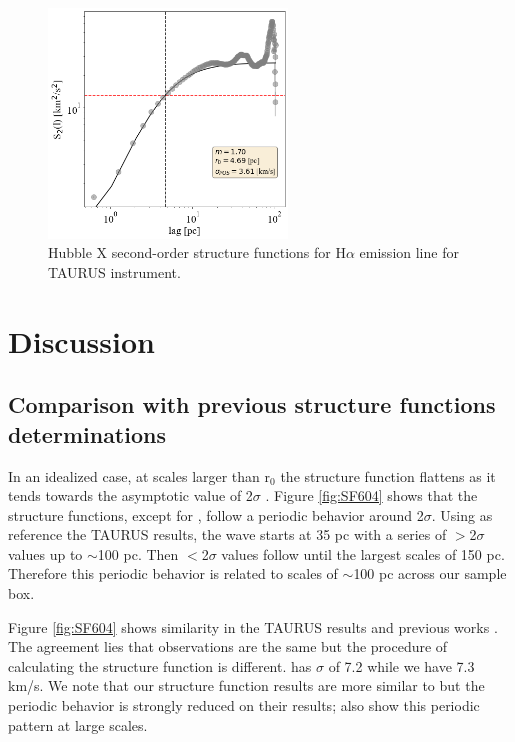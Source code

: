 \documentclass[fleqn,usenatbib]{mnras}
\begin{document}
\begin{figure}
\centering 
\includegraphics[width=2.5in]{Figures/HX}
\caption{Hubble X second-order structure functions for H$\alpha$ emission line for TAURUS instrument.}
\label{fig:SFX}
\end{figure}

\clearpage


\section{Discussion}\label{sec:disc}

\subsection{Comparison with previous structure functions determinations}

In an idealized case, at scales larger than r$_{0}$ the structure function flattens as it tends towards the asymptotic value of 2$\sigma$ \citep{arthur2016turbulence}. Figure \ref{fig:SF604} shows that the structure functions, except for \cite{2019arXiv191203543M}, follow a periodic behavior around 2$\sigma$. Using as reference the TAURUS results, the wave starts at 35 pc with a series of $ >$2$\sigma$ values up to $\sim$100 pc. Then $<$2$\sigma$ values follow until the largest scales of 150 pc. Therefore this periodic behavior is related to scales of $\sim$100 pc across our sample box.

Figure \ref{fig:SF604} shows similarity in the TAURUS results and previous works \citep{tanco1997,2019arXiv191203543M}. The agreement lies that observations are the same but the procedure of calculating the structure function is different. \citep{2019arXiv191203543M} has $\sigma$ of 7.2 while we have 7.3 km/s. We note that our structure function results are more similar to \cite{2019arXiv191203543M} but the periodic behavior is strongly reduced on their results; \citep{tanco1997} also show this periodic pattern at large scales.
\end{document}
